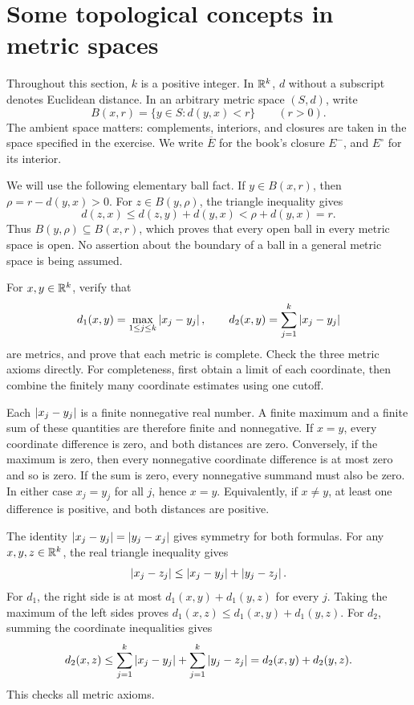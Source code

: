 \section{Some topological concepts in metric spaces}
\label{sec:metric-topology}
Throughout this section, $k$ is a positive integer. In $\mathbb{R}^k$,
$d$ without a subscript denotes Euclidean distance. In an arbitrary
metric space $(S,d)$, write
\[
 B(x,r)=\{y\in S:d(y,x)<r\}\qquad(r>0).
\]
The ambient space matters: complements, interiors, and closures are
taken in the space specified in the exercise. We write $\overline E$
for the book's closure $E^-$, and $E^\circ$ for its interior.

We will use the following elementary ball fact. If $y\in B(x,r)$,
then $\rho=r-d(y,x)>0$. For $z\in B(y,\rho)$, the triangle
inequality gives
\[
 d(z,x)\le d(z,y)+d(y,x)<\rho+d(y,x)=r.
\]
Thus $B(y,\rho)\subseteq B(x,r)$, which proves that every open
ball in every metric space is open. No assertion about the boundary
of a ball in a general metric space is being assumed.

\goal For $x,y\in\mathbb{R}^k$, verify that
\[
 d_1(x,y)=\max_{1\le j\le k}\left|x_j-y_j\right|,\qquad
 d_2(x,y)=\sum_{j=1}^k\left|x_j-y_j\right|
\]
are metrics, and prove that each metric is complete.
\idea Check the three metric axioms directly. For completeness,
first obtain a limit of each coordinate, then combine the finitely
many coordinate estimates using one cutoff.

Each $\left|x_j-y_j\right|$ is a finite nonnegative real number. A finite
maximum and a finite sum of these quantities are therefore finite
and nonnegative. If $x=y$, every coordinate difference is zero,
and both distances are zero. Conversely, if the maximum is zero,
then every nonnegative coordinate difference is at most zero and
so is zero. If the sum is zero, every nonnegative summand must
also be zero. In either case $x_j=y_j$ for all $j$, hence $x=y$.
Equivalently, if $x\ne y$, at least one difference is positive,
and both distances are positive.

The identity $\left|x_j-y_j\right|=\left|y_j-x_j\right|$ gives symmetry for
both formulas. For any $x,y,z\in\mathbb{R}^k$, the real triangle
inequality gives
\[
 \left|x_j-z_j\right|\le\left|x_j-y_j\right|+\left|y_j-z_j\right|.
\]
For $d_1$, the right side is at most $d_1(x,y)+d_1(y,z)$ for
every $j$. Taking the maximum of the left sides proves
$d_1(x,z)\le d_1(x,y)+d_1(y,z)$. For $d_2$, summing the
coordinate inequalities gives
\[
 d_2(x,z)\le\sum_{j=1}^k\left|x_j-y_j\right|
              +\sum_{j=1}^k\left|y_j-z_j\right|
 =d_2(x,y)+d_2(y,z).
\]
This checks all metric axioms.

